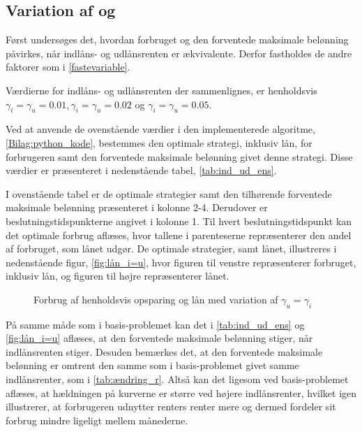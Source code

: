\subsection[Variation af  \texorpdfstring{$\gamma_i$ og $\gamma_u$}{Variation af indlåns- og udlånsrenten}]{Variation af  og }
Først undersøges det, hvordan forbruget og den forventede maksimale belønning påvirkes, når indlåns- og udlånsrenten er ækvivalente. Derfor fastholdes de andre faktorer som i \eqref{fastevariable}.

Værdierne for indlåns- og udlånsrenten der sammenlignes, er henholdsvis $\gamma_i = \gamma_u= 0.01, \gamma_i = \gamma_u=0.02$ og $\gamma_i = \gamma_u=0.05$.

Ved at anvende de ovenstående værdier i den implementerede algoritme, \autoref{Bilag:python_kode}, bestemmes den optimale strategi, inklusiv lån, for forbrugeren samt den forventede maksimale belønning givet denne strategi. Disse værdier er præsenteret i nedenstående tabel, \autoref{tab:ind_ud_ens}.



I ovenstående tabel er de optimale strategier samt den tilhørende forventede maksimale belønning præsenteret i kolonne 2-4. Derudover er beslutningstidspunkterne angivet i kolonne 1. Til hvert beslutningstidspunkt kan det optimale forbrug aflæses, hvor tallene i parenteserne repræsenterer den andel af forbruget, som lånet udgør. De optimale strategier, samt lånet, illustreres i nedenstående figur, \autoref{fig:lån_i=u}, hvor figuren til venstre repræsenterer forbruget, inklusiv lån, og figuren til højre repræsenterer lånet. 

\begin{figure}[H] 
    \begin{center}
        \resizebox{8cm}{!}{}
        \resizebox{8cm}{!}{}
    \end{center}
    \caption{Forbrug af henholdsvis opsparing og lån med variation af $\gamma_u=\gamma_i$}\label{fig:lån_i=u}
\end{figure}
På samme måde som i basis-problemet kan det i \autoref{tab:ind_ud_ens} og \autoref{fig:lån_i=u} aflæses, at den forventede maksimale belønning stiger, når indlånsrenten stiger. Desuden bemærkes det, at den forventede maksimale belønning er omtrent den samme som i basis-problemet givet samme indlånsrenter, som i \autoref{tab:ændring_r}. Altså kan det ligesom ved basis-problemet aflæses, at hældningen på kurverne er større ved højere indlånsrenter, hvilket igen illustrerer, at forbrugeren udnytter renters renter mere og dermed fordeler sit forbrug mindre ligeligt mellem månederne.

